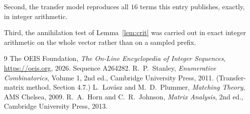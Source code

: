 \documentclass[11pt,a4paper]{article}
\theoremstyle{plain}
\theoremstyle{definition}
\begin{document}
Second, the transfer model reproduces all $16$ terms this entry publishes, exactly, in
integer arithmetic.

Third, the annihilation test of Lemma~\ref{lem:crit} was carried out in exact integer
arithmetic on the whole vector rather than on a sampled prefix.

\begin{thebibliography}{9}
 The OEIS Foundation, \emph{The On-Line Encyclopedia of Integer
Sequences}, \url{https://oeis.org}, 2026. Sequence A264282.
 R.~P.~Stanley, \emph{Enumerative Combinatorics}, Volume 1, 2nd ed.,
Cambridge University Press, 2011. (Transfer-matrix method, Section 4.7.)
 L.~Lov\'asz and M.~D.~Plummer, \emph{Matching Theory}, AMS Chelsea, 2009.
 R.~A.~Horn and C.~R.~Johnson, \emph{Matrix Analysis}, 2nd ed., Cambridge
University Press, 2013.
\end{thebibliography}
\end{document}
